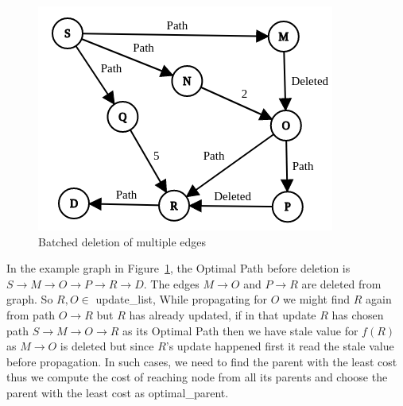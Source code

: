 \documentclass[a4paper]{article}
\begin{document}
\begin{figure}[H]
    \centering
    \includegraphics[scale=0.4]{img/Delete1.png}
    \caption{Batched deletion of multiple edges}
    \label{fig:delete_multiple}
\end{figure}

In the example graph in Figure~\ref{fig:delete_multiple}, the Optimal Path before deletion is $S \rightarrow M \rightarrow O \rightarrow P \rightarrow R \rightarrow D $.
The edges $ M \rightarrow O$ and $P \rightarrow R$ are deleted from graph. So $R,O \in $ update\_list, While propagating for $O$ we might find $R$ again from path $O \rightarrow R$ but $R$ has already updated, if in that update $R$ has chosen path $S \rightarrow M \rightarrow O \rightarrow R$ as its Optimal Path then we have stale value for $f(R)$ as $M \rightarrow O$ is deleted but since $R$'s update happened first it read the stale value before propagation. In such cases, we need to find the parent with the least cost thus we compute the cost of reaching node from all its parents and choose the parent with the least cost as optimal\_parent.
\end{document}
